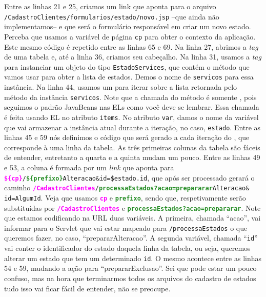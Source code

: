 Entre as linhas 21 e 25, criamos um link que aponta para o arquivo\linebreak%
\texttt{/CadastroClientes/formularios/estado/novo.jsp} –que ainda não implementamos– e que será o formulário responsável em criar um novo estado. Perceba que usamos a variável de página \texttt{cp} para obter o contexto da aplicação. Este mesmo código é repetido entre as linhas 65 e 69. Na linha 27, abrimos a \textit{tag} de uma tabela e, até a linha 36, criamos seu cabeçalho. Na linha 31, usamos a \textit{tag}  para instanciar um objeto do tipo \texttt{EstadoServices}, que contém o método que vamos usar para obter a lista de estados. Demos o nome de \texttt{servicos} para essa instância. Na linha 44, usamos um  para iterar sobre a lista retornada pelo método  da instância \texttt{servicos}. Note que a chamada do método  é somente , pois seguimos o padrão JavaBeans nas ELs como você deve se lembrar. Essa chamada é feita usando EL no atributo \texttt{items}. No atributo \texttt{var}, damos o nome da variável que vai armazenar a instância atual durante a iteração, no caso, \texttt{estado}. Entre as linhas 45 e 59 nós definimos o código que será gerado a cada iteração do , que corresponde à uma linha da tabela. As três primeiras colunas da tabela são fáceis de entender, entretanto a quarta e a quinta mudam um pouco. Entre as linhas 49 e 53, a coluna é formada por um \textit{link} que aponta para \texttt{\textbf{\textcolor{Fuchsia}{\$\{cp\}}}/\textbf{\textcolor{ForestGreen}{\$\{prefixo\}}}Alteracao\&id=\${estado.id}}, que após ser processado gerará o caminho \texttt{\textbf{\textcolor{Fuchsia}{/CadastroClientes}}/\textbf{\textcolor{ForestGreen}{processaEstados?acao=prepararar}}Alteracao\&}\linebreak%
\texttt{id=AlgumId}. Veja que usamos \textcolor{Fuchsia}{\texttt{\textbf{cp}}} e \textcolor{ForestGreen}{\texttt{\textbf{prefixo}}}, sendo que, respetivamente serão substituídas por \textcolor{Fuchsia}{\texttt{\textbf{/CadastroClientes}}} e \textcolor{ForestGreen}{\texttt{\textbf{processaEstados?acao=prepararar}}}. Note que estamos codificando na URL duas variáveis. A primeira, chamada ``acao'', vai informar para o Servlet que vai estar mapeado para \texttt{/processaEstados} o que queremos fazer, no caso, ``prepararAlteracao''. A segunda variável, chamada ``\texttt{id}'' vai conter o identificador do estado daquela linha da tabela, ou seja, queremos alterar um estado que tem um determinado \texttt{id}. O mesmo acontece entre as linhas 54 e 59, mudando a ação para ``prepararExclusao''. Sei que pode estar um pouco confuso, mas na hora que terminarmos todos os arquivos do cadastro de estados tudo isso vai ficar fácil de entender, não se preocupe.

